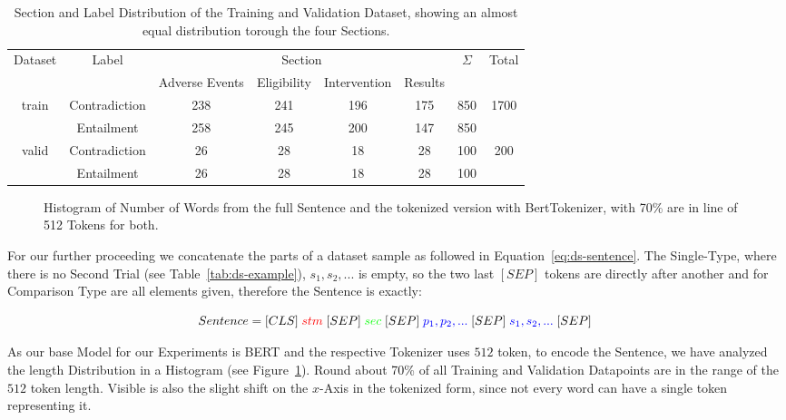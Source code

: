 \begin{table}[t]
    \centering
    \caption{Section and Label Distribution of the Training and Validation Dataset, showing
             an almost equal distribution torough the four Sections.}
    \label{tab:ds-distribution}
    \begin{tabular}{|c|c||cccc|c|c|}
    \hline
    \multirow{2}{*}{Dataset} & \multirow{2}{*}{Label} & \multicolumn{4}{c|}{Section} & \multirow{2}{*}{$\Sigma$} & \multirow{2}{*}{Total} \\
                           &               & Adverse Events & Eligibility & Intervention & Results &     &                       \\ \hline\hline
    \multirow{2}{*}{train} & Contradiction & 238            & 241         & 196          & 175     & 850 & \multirow{2}{*}{1700} \\
                           & Entailment    & 258            & 245         & 200          & 147     & 850 &                       \\ \hline
    \multirow{2}{*}{valid} & Contradiction & 26             & 28          & 18           & 28      & 100 & \multirow{2}{*}{200}  \\
                           & Entailment    & 26             & 28          & 18           & 28      & 100 &                       \\ \hline
    \end{tabular}
\end{table}


\begin{figure}[!b]
    \centering
    
    \caption{Histogram of Number of Words from the full Sentence and the tokenized version with BertTokenizer, 
             with 70\% are in line of 512 Tokens for both.}\label{cap:hist}
\end{figure}

For our further proceeding we concatenate the parts of a dataset sample as followed in Equation~\ref{eq:ds-sentence}.
The Single-Type, where there is no Second Trial (see Table~\ref{tab:ds-example}), $s_1, s_2, ... $
is empty, so the two last $[SEP]$ tokens are directly after another and for Comparison Type are all elements given, 
therefore the Sentence is exactly:

\begin{equation}\label{eq:ds-sentence}
\resizebox{0.91\hsize}{!}{%
 $Sentence = [CLS] \; \textcolor{red}{stm}\;
             [SEP] \; \textcolor{green}{sec}\;
             [SEP] \; \textcolor{blue}{p_1, p_2, ... }\;
             [SEP] \; \textcolor{blue}{s_1, s_2, ... }\;
             [SEP]$      
}
\end{equation}

As our base Model for our Experiments is BERT and the respective Tokenizer uses $512$ token, to encode the Sentence, 
we have analyzed the length Distribution in a Histogram (see Figure~\ref{cap:hist}). 
Round about 70\% of all Training and Validation Datapoints are in the range of the $512$ token length. 
Visible is also the slight shift on the $x$-Axis in the tokenized form, since not every word can have a single token
representing it.